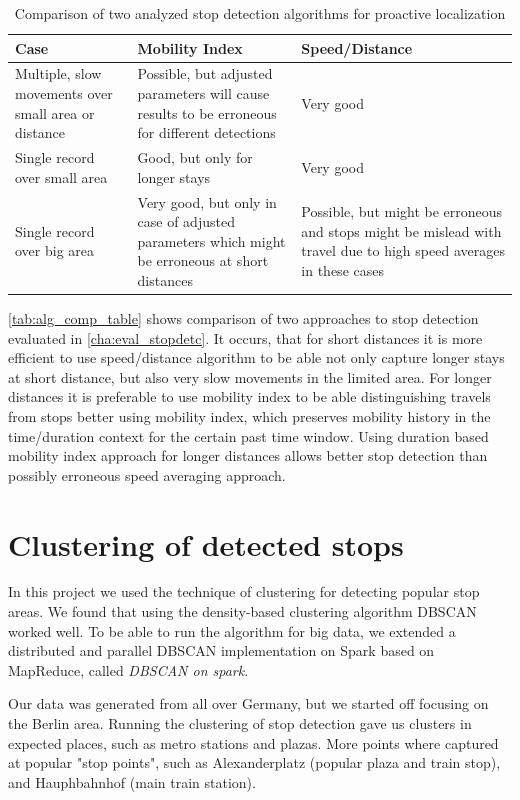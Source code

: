 \begin{table}[ht!]
	\centering
	\caption{Comparison of two analyzed stop detection algorithms for proactive localization}
	\label{tab:alg_comp_table}
	\begin{tabular}{|L|L|L|}
		\hline
		\textbf{Case} & \textbf{Mobility Index} & \textbf{Speed/Distance} 
		\\\hline
		Multiple, slow movements over small area or distance & Possible, but adjusted parameters will cause results to be erroneous for different detections & Very good
		\\\hline
		Single record over small area & Good, but only for longer stays & Very good  
		\\\hline
		Single record over big area & Very good, but only in case of adjusted parameters which might be erroneous at short distances & Possible, but might be erroneous and stops might be mislead with travel due to high speed averages in these cases
		\\\hline
	\end{tabular}
\end{table}

\FloatBarrier

\autoref{tab:alg_comp_table} shows comparison of two approaches to stop detection evaluated in \autoref{cha:eval_stopdetc}. It occurs, that for short distances it is more efficient to use speed/distance algorithm to be able not only capture longer stays at short distance, but also very slow movements in the limited area. For longer distances it is preferable to use mobility index to be able distinguishing travels from stops better using mobility index, which preserves mobility history in the time/duration context for the certain past time window. Using duration based mobility index approach for longer distances allows better stop detection than possibly erroneous speed averaging approach.

\section{Clustering of detected stops}
In this project we used the technique of clustering for detecting popular stop areas. We found that using the density-based clustering algorithm DBSCAN worked well. To be able to run the algorithm for big data, we extended a distributed and parallel DBSCAN implementation on Spark based on MapReduce, called \textit{DBSCAN on spark}. 

Our data was generated from all over Germany, but we started off focusing on the Berlin area. Running the clustering of stop detection gave us clusters in expected places, such as metro stations and plazas. More points where captured at popular "stop points", such as Alexanderplatz (popular plaza and train stop), and Hauphbahnhof (main train station). 

